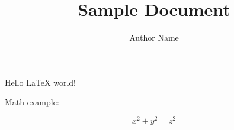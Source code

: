 \documentclass{article}
\title{Sample Document}
\author{Author Name}
\begin{document}
\maketitle

Hello LaTeX world!

Math example:

\[
x^2 + y^2 = z^2
\]
\end{document}
